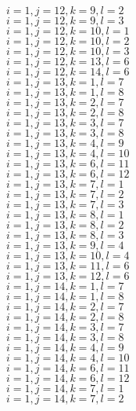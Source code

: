 \documentclass[14pt]{article}
\begin{document}
    $i=1,j=12,k=9,l=2 $ \\ 
    $i=1,j=12,k=9,l=3 $ \\ 
    $i=1,j=12,k=10,l=1 $ \\ 
    $i=1,j=12,k=10,l=2 $ \\ 
    $i=1,j=12,k=10,l=3 $ \\ 
    $i=1,j=12,k=13,l=6 $ \\ 
    $i=1,j=12,k=14,l=6 $ \\ 
    $i=1,j=13,k=1,l=7 $ \\ 
    $i=1,j=13,k=1,l=8 $ \\ 
    $i=1,j=13,k=2,l=7 $ \\ 
    $i=1,j=13,k=2,l=8 $ \\ 
    $i=1,j=13,k=3,l=7 $ \\ 
    $i=1,j=13,k=3,l=8 $ \\ 
    $i=1,j=13,k=4,l=9 $ \\ 
    $i=1,j=13,k=4,l=10 $ \\ 
    $i=1,j=13,k=6,l=11 $ \\ 
    $i=1,j=13,k=6,l=12 $ \\ 
    $i=1,j=13,k=7,l=1 $ \\ 
    $i=1,j=13,k=7,l=2 $ \\ 
    $i=1,j=13,k=7,l=3 $ \\ 
    $i=1,j=13,k=8,l=1 $ \\ 
    $i=1,j=13,k=8,l=2 $ \\ 
    $i=1,j=13,k=8,l=3 $ \\ 
    $i=1,j=13,k=9,l=4 $ \\ 
    $i=1,j=13,k=10,l=4 $ \\ 
    $i=1,j=13,k=11,l=6 $ \\ 
    $i=1,j=13,k=12,l=6 $ \\ 
    $i=1,j=14,k=1,l=7 $ \\ 
    $i=1,j=14,k=1,l=8 $ \\ 
    $i=1,j=14,k=2,l=7 $ \\ 
    $i=1,j=14,k=2,l=8 $ \\ 
    $i=1,j=14,k=3,l=7 $ \\ 
    $i=1,j=14,k=3,l=8 $ \\ 
    $i=1,j=14,k=4,l=9 $ \\ 
    $i=1,j=14,k=4,l=10 $ \\ 
    $i=1,j=14,k=6,l=11 $ \\ 
    $i=1,j=14,k=6,l=12 $ \\ 
    $i=1,j=14,k=7,l=1 $ \\ 
    $i=1,j=14,k=7,l=2 $ \\ 
\end{document}
